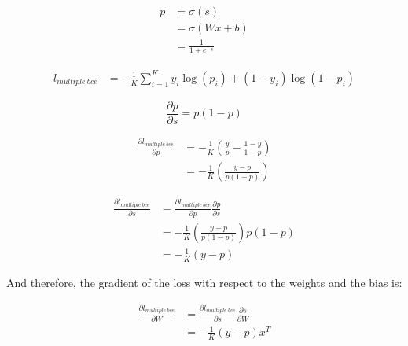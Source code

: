 \documentclass{article}
\begin{document}
\begin{equation}
    \begin{split}
        p &= \sigma(s) \\
        &= \sigma(Wx + b) \\
        &= \frac{1}{1+e^{-s}}
    \end{split}
\end{equation}


\begin{equation}
    \begin{split}
        l_{multiple\ bce} &= -\frac{1}{K}\sum_{i=1}^{K} y_i \log(p_i) + (1-y_i) \log(1-p_i)
    \end{split}
\end{equation}


\begin{equation}
    \frac{\partial p}{\partial s} = p(1-p)
\end{equation}


\begin{equation}
    \begin{split}
        \frac{\partial l_{multiple\ bce}}{\partial p} &= -\frac{1}{K} (\frac{y}{p} - \frac{1-y}{1-p}) \\
        &= -\frac{1}{K} \left( \frac{y - p}{p(1-p)} \right)
    \end{split}
\end{equation}


\begin{equation}
    \begin{split}
        \frac{\partial l_{multiple\ bce}}{\partial s} &= \frac{\partial l_{multiple\ bce}}{\partial p} \frac{\partial p}{\partial s} \\
        &= -\frac{1}{K} \left( \frac{y - p}{p(1-p)} \right) p(1-p) \\
        &= -\frac{1}{K} (y - p)
    \end{split}
\end{equation}


And therefore, the gradient of the loss with respect to the weights and the bias is:

\begin{equation}
    \begin{split}
        \frac{\partial l_{multiple\ bce}}{\partial W} &= \frac{\partial l_{multiple\ bce}}{\partial s} \frac{\partial s}{\partial W} \\
        &= -\frac{1}{K} (y - p) x^T
    \end{split}
\end{equation}
\end{document}
